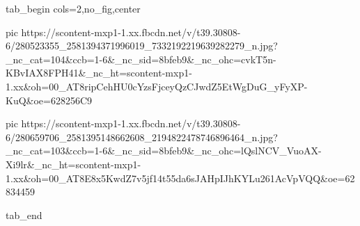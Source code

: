  
 
 
 
 

\ifcmt
  tab_begin cols=2,no_fig,center

     pic https://scontent-mxp1-1.xx.fbcdn.net/v/t39.30808-6/280523355_2581394371996019_7332192219639282279_n.jpg?_nc_cat=104&ccb=1-6&_nc_sid=8bfeb9&_nc_ohc=cvkT5n-KBvIAX8FPH41&_nc_ht=scontent-mxp1-1.xx&oh=00_AT8ripCehHU0cYzsFjceyQzCJwdZ5EtWgDuG_yFyXP-KuQ&oe=628256C9

     pic https://scontent-mxp1-1.xx.fbcdn.net/v/t39.30808-6/280659706_2581395148662608_2194822478746896464_n.jpg?_nc_cat=103&ccb=1-6&_nc_sid=8bfeb9&_nc_ohc=lQslNCV_VuoAX-Xi9lr&_nc_ht=scontent-mxp1-1.xx&oh=00_AT8E8x5KwdZ7v5jf14t55da6sJAHpIJhKYLu261AcVpVQQ&oe=62834459

  tab_end
\fi

